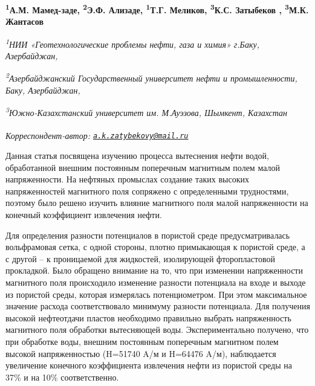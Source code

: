 
\begin{articleheader}

{\bfseries
\textsuperscript{1}А.М. Мамед-заде\authorid,
\textsuperscript{2}Э.Ф. Ализаде\authorid,
\textsuperscript{1}Т.Г. Меликов\authorid,
\textsuperscript{3}К.С. Затыбеков\textsuperscript{\envelope } \authorid,
\textsuperscript{3}М.К. Жантасов\authorid}
\end{articleheader}

\begin{affiliation}
\emph{\textsuperscript{1}НИИ «Геотехнологические проблемы нефти, газа и химия» г.Баку, Азербайджан,}

\emph{\textsuperscript{2}Азербайджанский Государственный университет нефти и промышленности, Баку, Азербайджан,}

\emph{\textsuperscript{3}Южно-Казахстанский университет им. М.Ауэзова, Шымкент, Казахстан}

\raggedright \textsuperscript{\envelope }{\em Корреспондент-автор: \href{mailto:a.k.zatybekovy@mail.ru}{\nolinkurl{a.k.zatybekovy@mail.ru}}}
\end{affiliation}

Данная статья посвящена изучению процесса вытеснения нефти водой,
обработанной внешним постоянным поперечным магнитным полем малой
напряженности. На нефтяных промыслах создание таких высоких
напряженностей магнитного поля сопряжено с определенными трудностями,
поэтому было решено изучить влияние магнитного поля малой напряженности
на конечный коэффициент извлечения нефти.

Для определения разности потенциалов в пористой среде предусматривалась
вольфрамовая сетка, с одной стороны, плотно примыкающая к пористой
среде, а с другой -- к проницаемой для жидкостей, изолирующей
фторопластовой прокладкой. Было обращено внимание на то, что при
изменении напряженности магнитного поля происходило изменение разности
потенциала на входе и выходе из пористой среды, которая измерялась
потенциометром. При этом максимальное значение расхода соответствовало
минимуму разности потенциала. Для получения высокой нефтеотдачи пластов
необходимо правильно выбрать напряженность магнитного поля обработки
вытесняющей воды. Экспериментально получено, что при обработке воды,
внешним постоянным поперечным магнитном полем высокой напряженностью
(H=51740 A/м и H=64476 A/м), наблюдается увеличение конечного
коэффициента извлечения нефти из пористой среды на 37\% и на 10\%
соответственно.

